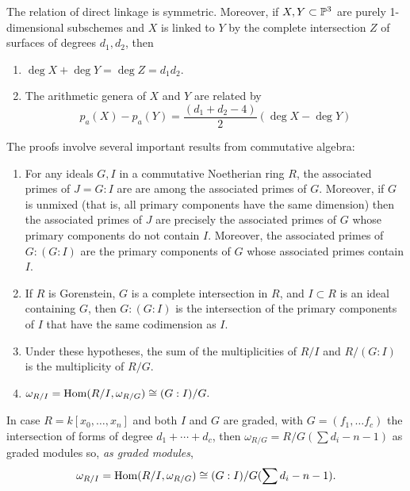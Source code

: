 \begin{theorem}\label{justification of general linkage} The relation of direct linkage is symmetric. Moreover, if $X,Y\subset {\mathbb P}^{3}$ are purely 1-dimensional subschemes and $X$ is linked to $Y$ by the complete intersection $Z$ of surfaces of degrees $d_{1}, d_{2}$, then
\begin{enumerate}
 \item $\deg X+\deg Y = \deg Z = d_{1}d_{2}$.
 \item  The arithmetic genera of $X$ and $Y$ are related by
$$
p_{a}(X) - p_{a}(Y) =\frac{(d_{1}+d_{2}-4)}{2} (\deg X - \deg Y)
$$
\end{enumerate}
 \end{theorem}
 
 The proofs involve several important results from commutative algebra:
 
\begin{lemma} \label{double colon}
\begin{enumerate}
\item For any ideals $G,I$ in a commutative Noetherian ring $R$, the associated primes of  $J = G:I$ are  are among the associated primes of $G$. Moreover, if $G$ is unmixed (that is, all primary components have the same dimension) then  
the associated primes of $J$ are precisely the associated primes of $G$ whose primary components do not contain $I$.
Moreover, the associated primes of $G:(G:I)$ are the primary components of $G$ whose associated primes contain $I$.

\item  If $R$ is Gorenstein, $G$ is a complete intersection in $R$, and $I\subset R$ is an ideal containing $G$, then $G:(G:I)$ is the 
intersection of the primary components of $I$ that have the same codimension as $I$. 

\item Under these hypotheses, the sum of the multiplicities of $R/I$ and $R/(G:I)$ is the multiplicity of $R/G$.

\item 
$
\omega_{R/I} = \operatorname{Hom}(R/I, \omega_{R/G})\cong (G:I)/G.
$\\
\end{enumerate}
\end{lemma}

In case $R = k[x_{0},\dots,x_{n}]$ and both $I$ and $G$ are graded, with $G = (f_{1}, \dots f_{c})$ the intersection of forms of degree
$d_{1}+\cdots + d_{c}$, then $\omega_{R/G} = R/G(\sum d_{i} -n-1)$ as graded modules so, \emph{as graded modules},
$$
\omega_{R/I} = \operatorname{Hom}(R/I, \omega_{R/G})\cong (G:I)/G(\sum d_{i} -n-1).
$$


